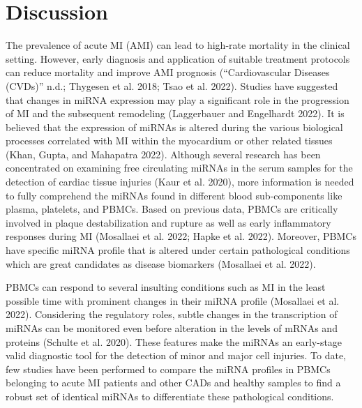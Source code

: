 \documentclass[smallextended]{svjour3}       %
\begin{document}
\hypertarget{discussion}{%
\section{Discussion}\label{discussion}}

The prevalence of acute MI (AMI) can lead to high-rate mortality in the
clinical setting. However, early diagnosis and application of suitable
treatment protocols can reduce mortality and improve AMI prognosis
({``Cardiovascular Diseases ({CVDs})''} n.d.; Thygesen et al. 2018; Tsao
et al. 2022). Studies have suggested that changes in miRNA expression
may play a significant role in the progression of MI and the subsequent
remodeling (Laggerbauer and Engelhardt 2022). It is believed that the
expression of miRNAs is altered during the various biological processes
correlated with MI within the myocardium or other related tissues (Khan,
Gupta, and Mahapatra 2022). Although several research has been
concentrated on examining free circulating miRNAs in the serum samples
for the detection of cardiac tissue injuries (Kaur et al. 2020), more
information is needed to fully comprehend the miRNAs found in different
blood sub-components like plasma, platelets, and PBMCs. Based on
previous data, PBMCs are critically involved in plaque destabilization
and rupture as well as early inflammatory responses during MI (Mosallaei
et al. 2022; Hapke et al. 2022). Moreover, PBMCs have specific miRNA
profile that is altered under certain pathological conditions which are
great candidates as disease biomarkers (Mosallaei et al. 2022).

PBMCs can respond to several insulting conditions such as MI in the
least possible time with prominent changes in their miRNA profile
(Mosallaei et al. 2022). Considering the regulatory roles, subtle
changes in the transcription of miRNAs can be monitored even before
alteration in the levels of mRNAs and proteins (Schulte et al. 2020).
These features make the miRNAs an early-stage valid diagnostic tool for
the detection of minor and major cell injuries. To date, few studies
have been performed to compare the miRNA profiles in PBMCs belonging to
acute MI patients and other CADs and healthy samples to find a robust
set of identical miRNAs to differentiate these pathological conditions.
\end{document}
